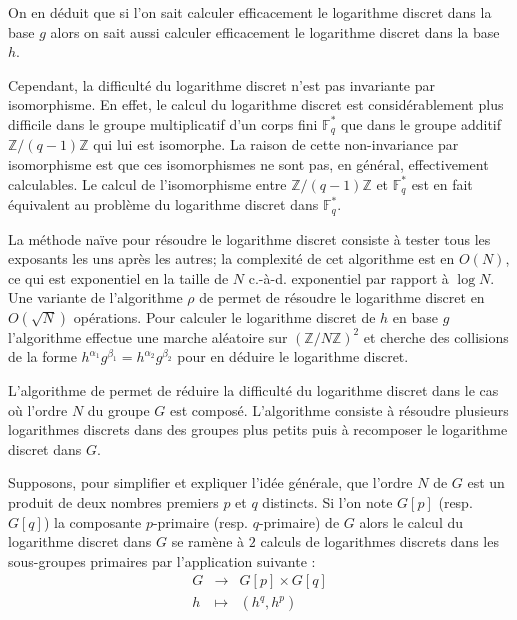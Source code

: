 \documentclass[a4paper]{article}
\theoremstyle{definition}
\theoremstyle{remark}
\numberwithin{equation}{section}
\begin{document}
On en déduit que si l'on sait calculer efficacement le logarithme discret dans la base $g$ alors on sait aussi calculer efficacement le logarithme discret dans la base $h$.

Cependant, la difficulté du logarithme discret n'est pas invariante par isomorphisme. En effet, le calcul du logarithme discret est considérablement plus difficile dans le groupe multiplicatif d'un corps fini $\mathbb{F}^*_q$ que dans le groupe additif $\mathbb{Z}/(q-1)\mathbb{Z}$ qui lui est isomorphe. La raison de cette non-invariance par isomorphisme est que ces isomorphismes ne sont pas, en général, effectivement
calculables. Le calcul de l'isomorphisme entre $\mathbb{Z}/(q-1)\mathbb{Z}$ et $\mathbb{F}^*_q$ est en fait équivalent au problème du logarithme discret dans $\mathbb{F}_q^*$.

La méthode naïve pour résoudre le logarithme discret consiste à tester tous les exposants les uns après les autres; la complexité de cet algorithme est en $O(N)$, ce qui est exponentiel en la taille de $N$ c.-à-d. exponentiel par rapport à $\log N$. Une variante de l'algorithme $\rho$ de \citet{pollard} permet de résoudre le logarithme discret en $O(\sqrt{N})$ opérations. Pour calculer le logarithme discret de $h$ en base $g$ l'algorithme effectue une marche aléatoire sur $(\mathbb{Z}/N\mathbb{Z})^2$ et cherche des collisions de la forme $h^{\alpha_1}g^{\beta_1} = h^{\alpha_2}g^{\beta_2}$ pour en déduire le logarithme discret.

L'algorithme de \citet{pohlig-hellman} permet de réduire la difficulté du logarithme discret dans le cas où l'ordre $N$ du groupe $G$ est composé. L'algorithme consiste à résoudre plusieurs logarithmes discrets dans des groupes plus petits puis à recomposer le logarithme discret dans $G$.

Supposons, pour simplifier et expliquer l'idée générale, que l'ordre $N$ de $G$ est un produit de deux nombres premiers $p$ et $q$ distincts. Si l'on note $G[p]$ (resp. $G[q]$) la composante $p$-primaire (resp. $q$-primaire) de $G$ alors le calcul du logarithme discret dans $G$ se ramène à $2$ calculs de logarithmes discrets dans les sous-groupes primaires par l'application suivante :
\begin{equation*}
\begin{array}{lcl}
G & \longrightarrow & G[p] \times G[q] \\
h & \longmapsto & (h^q, h^p)
\end{array}
\end{equation*}
\end{document}
